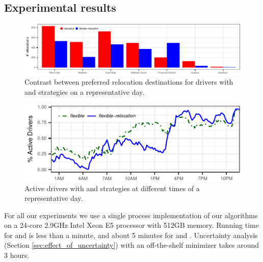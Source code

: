
\subsection{Experimental results}


\begin{figure}     \centering
\includegraphics{figures/relocation_endzones.pdf}
\caption{Contrast between preferred relocation destinations for
drivers with      {\relocation} and {\relocationflexible} strategies
on a representative day.}     \label{fig:relocation_endzones}
\end{figure}

\begin{figure}[h]
	\centering
	\includegraphics{figures/simulated_schedules.pdf}
	\setlength{\belowcaptionskip}{-10pt}
	\caption{Active drivers with {\flexible} and {\relocationflexible}
	strategies at different times of a representative day.}
	\label{fig:simulated_schedules}
\end{figure}

For all our experiments we use a single process implementation of our algorithms on a 24-core 2.9GHz Intel Xeon E5 processor with 512GB memory. Running time for  {\naive} and {\relocation}  is less than a minute, and about 5 minutes for  {\flexible} and  {\relocationflexible}. 
Uncertainty analysis (Section \ref{sec:effect_of_uncertainty}) with an off-the-shelf minimizer takes around 3 hours.

